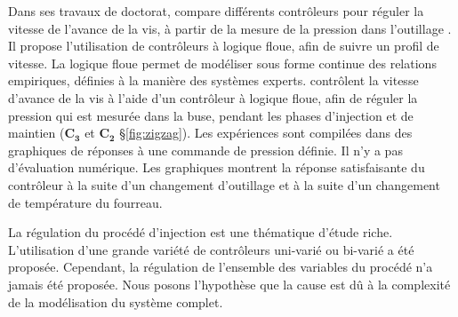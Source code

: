 Dans ses travaux de doctorat, \citeauthor{tsoi_fuzzy_1997} compare différents contrôleurs pour réguler la vitesse de l'avance de la vis, à partir de la mesure de la pression dans l'outillage \cite{tsoi_fuzzy_1997}.
Il propose l'utilisation de contrôleurs à logique floue, afin de suivre un profil de vitesse.
La logique floue permet de modéliser sous forme continue des relations empiriques, définies à la manière des systèmes experts.
\citeauthor{huang_fuzzy_2000} \cite{huang_fuzzy_2000} contrôlent la vitesse d’avance de la vis à l'aide d'un contrôleur à logique floue, afin de réguler la pression qui est mesurée dans la buse, pendant les phases d’injection et de maintien ($\boldsymbol{C_3}$ et $\boldsymbol{C_2}$ §\ref{fig:zigzag}).
Les expériences sont compilées dans des graphiques de réponses à une commande de pression définie.
Il n'y a pas d’évaluation numérique.
Les graphiques montrent la réponse satisfaisante du contrôleur à la suite d'un changement d'outillage et à la suite d'un changement de température du fourreau.

La régulation du procédé d'injection est une thématique d'étude riche.
L'utilisation d'une grande variété de contrôleurs uni-varié ou bi-varié a été proposée.
Cependant, la régulation de l'ensemble des variables du procédé n'a jamais été proposée.
Nous posons l'hypothèse que la cause est dû à la complexité de la modélisation du système complet.

